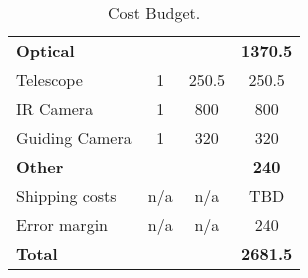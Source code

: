 \begin{table}[H]
\begin{tabular}{|l|c|c|c|}
\rowcolor[HTML]{9B9B9B}
\textbf{Optical} &  &  & \textbf{1370.5}  \\
Telescope & 1 & 250.5 & 250.5  \\
IR Camera & 1 & 800 & 800  \\
Guiding Camera & 1 & 320 & 320  \\

\rowcolor[HTML]{9B9B9B}
\textbf{Other} &  &  & \textbf{240}  \\
Shipping costs & n/a & n/a & TBD  \\
Error margin & n/a & n/a & 240  \\
\hline
\textbf{Total} &  &  & \textbf{2681.5}  \\
\hline
\end{tabular}
\caption{Cost Budget.}
\label{table:mass-and-cost-budget}
\end{table}

\raggedbottom